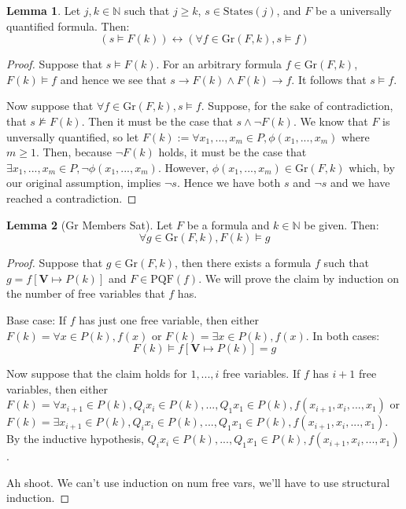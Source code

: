 \documentclass[12pt]{article}
\theoremstyle{definition}
\newtheorem{lemma}{Lemma}
\theoremstyle{remark}
\newcommand{\states}{\text{States}}
\newcommand{\gr}{\text{Gr}}
\newcommand{\PQF}{\text{PQF}}
\begin{document}
\begin{lemma}
  \label{lem:pnf-ground}
  Let $j,k \in \mathbb{N}$ such that $j \geq k$, $s \in \states(j)$, and $F$ be a universally quantified formula.  Then:
  $$(s \models F(k)) \leftrightarrow (\forall f \in \gr(F,k), s \models f)$$
\end{lemma}
\begin{proof}
  Suppose that $s \models F(k)$.  For an arbitrary formula $f \in \gr(F,k)$, $F(k) \models f$ and hence we see that $s \rightarrow F(k) \land F(k) \rightarrow f$.  It follows that $s \models f$.

  Now suppose that $\forall f \in \gr(F,k), s \models f$.  Suppose, for the sake of contradiction, that $s \not\models F(k)$.  Then it must be the case that $s \land \neg F(k)$.  We know that $F$ is unversally quantified, so let $F(k) := \forall x_1,...,x_m \in P, \phi(x_1,...,x_m)$ where $m \geq 1$.  Then, because $\neg F(k)$ holds, it must be the case that $\exists x_1,...,x_m \in P, \neg \phi(x_1,...,x_m)$.  However, $\phi(x_1,...,x_m) \in \gr(F,k)$ which, by our original assumption, implies $\neg s$.  Hence we have both $s$ and $\neg s$ and we have reached a contradiction.
\end{proof}

\begin{lemma}[Gr Members Sat]
  \label{lem:gr-sat}
  Let $F$ be a formula and $k \in \mathbb{N}$ be given.  Then:
  $$\forall g \in \gr(F,k), F(k) \models g$$
\end{lemma}
\begin{proof}
  Suppose that $g \in \gr(F,k)$, then there exists a formula $f$ such that $g = f[\mathbf{V} \mapsto P(k)]$ and $F \in \PQF(f)$.  We will prove the claim by induction on the number of free variables that $f$ has.

  Base case: If $f$ has just one free variable, then either $F(k) = \forall x \in P(k), f(x)$ or $F(k) = \exists x \in P(k), f(x)$.  In both cases:
  $$F(k) \models f[\mathbf{V} \mapsto P(k)] = g$$

  Now suppose that the claim holds for $1,...,i$ free variables.  If $f$ has $i+1$ free variables, then either $F(k) = \forall x_{i+1} \in P(k), Q_i x_i \in P(k), ..., Q_1 x_1 \in P(k), f(x_{i+1},x_i,...,x_1)$ or $F(k) = \exists x_{i+1} \in P(k), Q_i x_i \in P(k), ..., Q_1 x_1 \in P(k), f(x_{i+1},x_i,...,x_1)$.  By the inductive hypothesis, $Q_i x_i \in P(k), ..., Q_1 x_1 \in P(k), f(x_{i+1},x_i,...,x_1)$.

  Ah shoot.  We can't use induction on num free vars, we'll have to use structural induction.
\end{proof}
\end{document}
